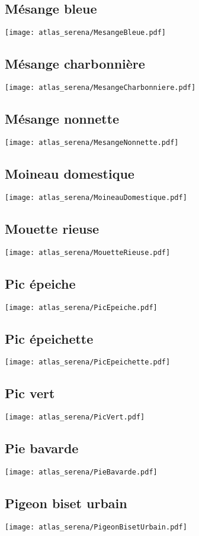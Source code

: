\subsection{Mésange bleue}
\texttt{[image: atlas\_serena/MesangeBleue.pdf]}
\subsection{Mésange charbonnière}
\texttt{[image: atlas\_serena/MesangeCharbonniere.pdf]}
\subsection{Mésange nonnette}
\texttt{[image: atlas\_serena/MesangeNonnette.pdf]}
\subsection{Moineau domestique}
\texttt{[image: atlas\_serena/MoineauDomestique.pdf]}
\subsection{Mouette rieuse}
\texttt{[image: atlas\_serena/MouetteRieuse.pdf]}
\subsection{Pic épeiche}
\texttt{[image: atlas\_serena/PicEpeiche.pdf]}
\subsection{Pic épeichette}
\texttt{[image: atlas\_serena/PicEpeichette.pdf]}
\subsection{Pic vert}
\texttt{[image: atlas\_serena/PicVert.pdf]}
\subsection{Pie bavarde}
\texttt{[image: atlas\_serena/PieBavarde.pdf]}
\subsection{Pigeon biset urbain}
\texttt{[image: atlas\_serena/PigeonBisetUrbain.pdf]}
